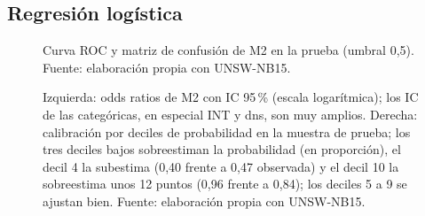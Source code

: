 \subsection{Regresión logística}

\begin{figure}[htbp]
  \centering
  \caption[Curva ROC y matriz de confusión de M2]{Curva ROC y matriz de confusión de M2 en la prueba (umbral 0,5). Fuente: elaboración propia con UNSW-NB15.}
  \label{fig:log-roc}
\end{figure}

\begin{figure}[htbp]
  \centering
  \caption[Odds ratios y calibración de M2]{Izquierda: odds ratios de M2 con IC 95\,\% (escala logarítmica); los IC de las categóricas, en especial INT y dns, son muy amplios. Derecha: calibración por deciles de probabilidad en la muestra de prueba; los tres deciles bajos sobreestiman la probabilidad (en proporción), el decil 4 la subestima (0,40 frente a 0,47 observada) y el decil 10 la sobreestima unos 12 puntos (0,96 frente a 0,84); los deciles 5 a 9 se ajustan bien. Fuente: elaboración propia con UNSW-NB15.}
  \label{fig:a-log-or-cal}
\end{figure}
\FloatBarrier
